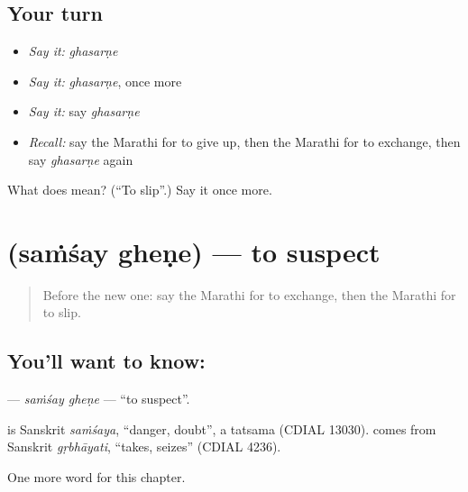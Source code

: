\subsection*{Your turn}
\begin{itemize}
\raggedright
  \item \emph{Say it:} \emph{ghasarṇe}
  \item \emph{Say it:} \emph{ghasarṇe}, once more
  \item \emph{Say it:} say \emph{ghasarṇe}
  \item \emph{Recall:} say the Marathi for to give up, then the Marathi for to exchange, then say \emph{ghasarṇe} again
\end{itemize}

\begin{tcolorbox}[breakable,colback=teal!4,colframe=teal!35!black,title={Before you move on}]
What does  mean? (\textquotedblleft{}To slip\textquotedblright{}.) Say it once more.
\end{tcolorbox}
\section[\texorpdfstring{\mr{संशय} \mr{घेणे} (saṁśay gheṇe)}{संशय घेणे (saṁśay gheṇe)}]{  (saṁśay gheṇe) — to suspect}

\label{lesson:MR-C167-samsay-ghene}



\begin{quote}
Before the new one: say the Marathi for to exchange, then the Marathi for to slip.
\end{quote}

\subsection*{You'll want to know:  }
\textbf{ } — \emph{saṁśay gheṇe} — \textquotedblleft{}to suspect\textquotedblright{}.

\begin{cousinweb}
\textbf{} is Sanskrit \emph{saṁśaya}, \textquotedblleft{}danger, doubt\textquotedblright{}, a tatsama (CDIAL 13030). \textbf{} comes from Sanskrit \emph{gṛbhāyati}, \textquotedblleft{}takes, seizes\textquotedblright{} (CDIAL 4236).
\end{cousinweb}

\begin{grammarlens}[title={What you've built}]
One more word for this chapter.
\end{grammarlens}

